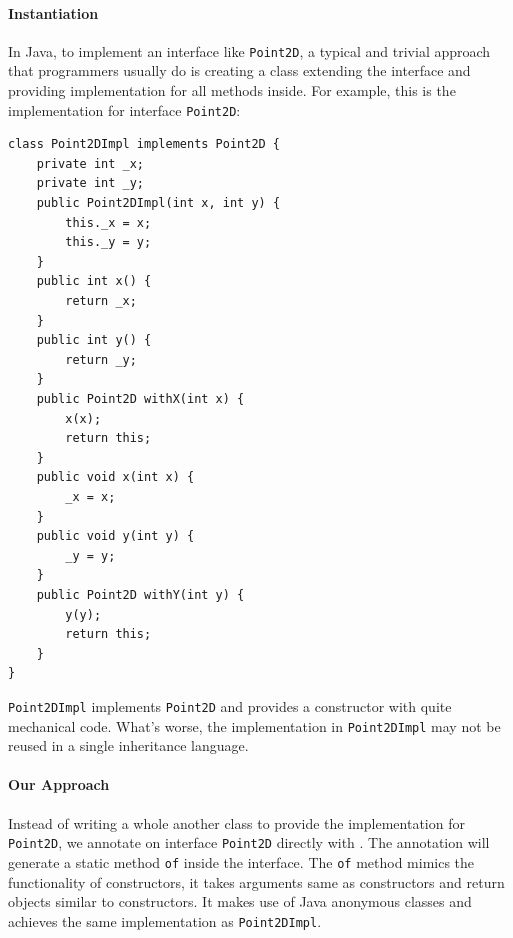 

\paragraph{Instantiation}
In Java, to implement an interface like \texttt{Point2D}, a typical and trivial
approach that programmers usually do is creating a class extending the interface
and providing implementation for all methods inside. For example, this is the
implementation for interface \texttt{Point2D}:

\begin{lstlisting}
class Point2DImpl implements Point2D {
    private int _x;
    private int _y;
    public Point2DImpl(int x, int y) {
        this._x = x;
        this._y = y;
    }
    public int x() {
        return _x;
    }
    public int y() {
        return _y;
    }
    public Point2D withX(int x) {
        x(x);
        return this;
    }
    public void x(int x) {
        _x = x;
    }
    public void y(int y) {
        _y = y;
    }
    public Point2D withY(int y) {
        y(y);
        return this;
    }
}
\end{lstlisting}

\texttt{Point2DImpl} implements \texttt{Point2D} and provides a constructor with
quite mechanical code. What's worse, the implementation in \texttt{Point2DImpl}
may not be reused in a single inheritance language.

\paragraph{Our Approach}
Instead of writing a whole another class to provide the implementation for
\texttt{Point2D}, we annotate on interface \texttt{Point2D} directly with
\mixin. The \mixin annotation will generate a static method \texttt{of} inside
the interface. The \texttt{of} method mimics the functionality of constructors,
it takes arguments same as constructors and return objects similar to
constructors. It makes use of Java anonymous classes and achieves the same
implementation as \texttt{Point2DImpl}.

